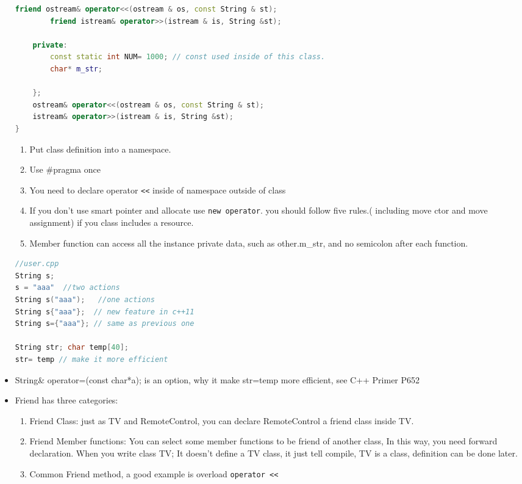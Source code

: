 \documentclass[a4paper,11pt,twoside]{book}
\begin{document}
\begin{itemize}
\begin{lstlisting}[frame=single, language=c++]
		friend ostream& operator<<(ostream & os, const String & st);
		friend istream& operator>>(istream & is, String &st);
		
	private:
		const static int NUM= 1000; // const used inside of this class.
		char* m_str;
		
	};
	ostream& operator<<(ostream & os, const String & st);
	istream& operator>>(istream & is, String &st);
}
\end{lstlisting}
	
	\begin{enumerate}
		\item Put class definition into a namespace.
		\item Use \#pragma once
		\item You need to declare operator \verb=<<= inside of namespace outside of class
		\item If you don't use smart pointer and allocate use \texttt{new operator}. you should follow five rules.( including move ctor and move assignment) if you class includes a resource.
		\item Member function can access all the instance private data, such as other.m\_str, and no semicolon after each function.
	\end{enumerate}
	
	
\begin{lstlisting}[frame=single, language=c++]
//user.cpp
String s;
s = "aaa"  //two actions
String s("aaa");   //one actions
String s{"aaa"};  // new feature in c++11
String s={"aaa"}; // same as previous one
	
String str; char temp[40];
str= temp // make it more efficient
\end{lstlisting}
	
	\item String\& operator=(const char*a); is an option, why it make str=temp more efficient, see C++ Primer P652
	
	\item  Friend has three categories:
	\begin{enumerate}
		\item Friend Class: just as TV and RemoteControl, you can declare RemoteControl a friend class inside TV.
		\item Friend Member functions: You can select some member functions to be friend of another class, In this way, you need forward declaration.  When you write class TV;  It doesn't define a TV class, it just tell compile, TV is a class, definition can be done later.
		\item Common Friend method, a good example is overload \verb=operator <<=
	\end{enumerate}
	

\end{itemize}
\end{document}
